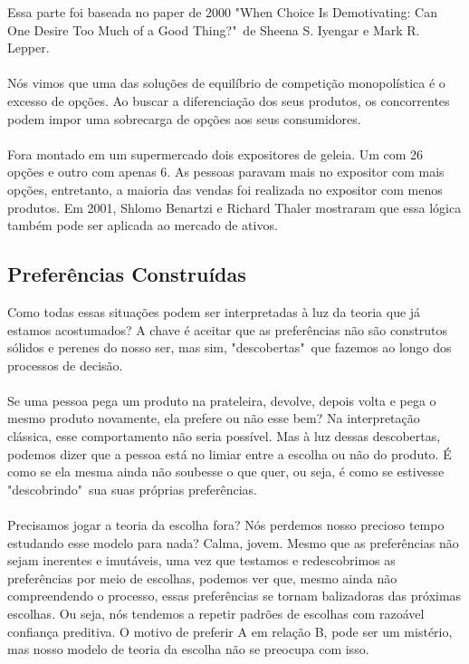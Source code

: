 \documentclass[a4paper,11pt,oneside]{book}
\theoremstyle{definition}
\theoremstyle{break}
\begin{document}
Essa parte foi baseada no paper de 2000 "When Choice Is Demotivating: Can One Desire Too Much of a Good Thing?"\ de Sheena S. Iyengar e Mark R. Lepper.
\\~\\
Nós vimos que uma das soluções de equilíbrio de competição monopolística é o excesso de opções. Ao buscar a diferenciação dos seus produtos, os concorrentes podem impor uma sobrecarga de opções aos seus consumidores.
\\~\\
Fora montado em um supermercado dois expositores de geleia. Um com 26 opções e outro com apenas 6. As pessoas paravam mais no expositor com mais opções, entretanto, a maioria das vendas foi realizada no expositor com menos produtos. Em 2001, Shlomo Benartzi e Richard Thaler mostraram que essa lógica também pode ser aplicada ao mercado de ativos.

\subsection{Preferências Construídas}

Como todas essas situações podem ser interpretadas à luz da teoria que já estamos acostumados? A chave é aceitar que as preferências não são construtos sólidos e perenes do nosso ser, mas sim, "descobertas"\ que fazemos ao longo dos processos de decisão.
\\~\\
Se uma pessoa pega um produto na prateleira, devolve, depois volta e pega o mesmo produto novamente, ela prefere ou não esse bem? Na interpretação clássica, esse comportamento não seria possível. Mas à luz dessas descobertas, podemos dizer que a pessoa está no limiar entre a escolha ou não do produto. É como se ela mesma ainda não soubesse o que quer, ou seja, é como se estivesse "descobrindo"\ sua suas próprias preferências.
\\~\\
Precisamos jogar a teoria da escolha fora? Nós perdemos nosso precioso tempo estudando esse modelo para nada? Calma, jovem. Mesmo que as preferências não sejam inerentes e imutáveis, uma vez que testamos e redescobrimos as preferências por meio de escolhas, podemos ver que, mesmo ainda não compreendendo o processo, essas preferências se tornam balizadoras das próximas escolhas. Ou seja, nós tendemos a repetir padrões de escolhas com razoável confiança preditiva. O motivo de preferir A em relação B, pode ser um mistério, mas nosso modelo de teoria da escolha não se preocupa com isso.
\end{document}
